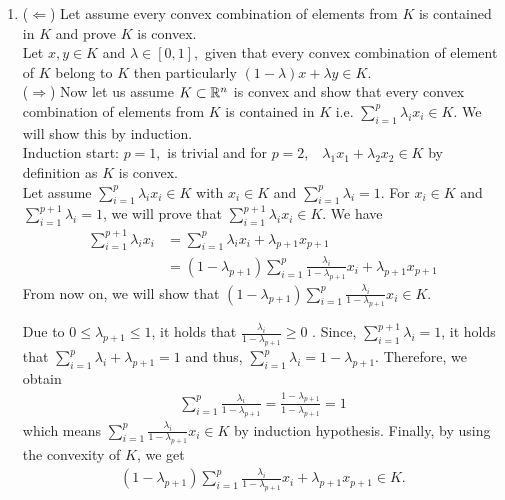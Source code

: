 \documentclass{ExerciseSheet}
\begin{document}
\begin{solution}
\begin{enumerate}
    \item ($\Leftarrow$) Let assume every convex combination of elements from $K$ is contained in $K$ and prove $K$ is convex.\\
    Let $x,y\in K$ and $\lambda\in [0, 1],$ given that every convex combination of element of $K$ belong to $K$ then particularly $(1-\lambda)x+\lambda y\in K.$\\
    ($\Rightarrow$) Now let us assume $K\subset \mathbb{R}^n$ is convex and show that every convex combination of elements from $K$ is contained in $K$ i.e. $\displaystyle \sum_{i=1}^{p}\lambda_ix_i\in K.$ We will show this by induction.\\
    Induction start:  $p=1,$ is trivial and for $p=2,$~ $\lambda_1x_1+\lambda_2x_2\in K$ by definition as $K$ is convex.\\
    Let assume $\displaystyle \sum_{i=1}^{p}\lambda_ix_i\in K$ with $x_i\in K$ and $\displaystyle \sum_{i=1}^{p}\lambda_i=1$. For $x_i \in K$ and $\displaystyle\sum_{i=1}^{p+1}\lambda_i=1$, we will prove that $ \displaystyle\sum_{i=1}^{p+1}\lambda_ix_i \in K.$
    We have
      \begin{align}
          \sum_{i=1}^{p+1}\lambda_ix_i&= \sum_{i=1}^{p}\lambda_ix_i+\lambda_{p+1}x_{p+1}\nonumber\\
                           &=(1-\lambda_{p+1})\sum_{i=1}^{p}\frac{\lambda_i}{1-\lambda_{p+1}}x_i+\lambda_{p+1}x_{p+1} \label{ induction step}
      \end{align}
    From now on, we will show that $\displaystyle(1-\lambda_{p+1})\sum_{i=1}^{p}\frac{\lambda_i}{1-\lambda_{p+1}}x_i \in K$. 

Due to $0\leq \lambda_{p+1}\leq 1$, it holds that $\frac{\lambda_i}{1-\lambda_{p+1}}\geq0$ . Since, $\displaystyle \sum_{i=1}^{p+1}\lambda_i=1$, it holds that  $\displaystyle \sum_{i=1}^{p}\lambda_i+ \lambda_{p+1}=1$ and thus, $\sum_{i=1}^{p}\lambda_i=1-\lambda_{p+1}.$
      Therefore, we obtain
   \begin{align*}
        \sum_{i=1}^{p}\frac{\lambda_i}{1-\lambda_{p+1}}=\frac{1-\lambda_{p+1}}{1-\lambda_{p+1}}=1
    \end{align*}
 which means $\displaystyle \sum_{i=1}^{p}\frac{\lambda_i}{1-\lambda_{p+1}}x_i\in K$ by induction hypothesis. Finally, by using the convexity of $K$, we get 
  \begin{align*}
      (1-\lambda_{p+1})\sum_{i=1}^{p}\frac{\lambda_i}{1-\lambda_{p+1}}x_i+\lambda_{p+1}x_{p+1}\in K.
  \end{align*}
 





\end{enumerate}
\end{solution}
\end{document}
